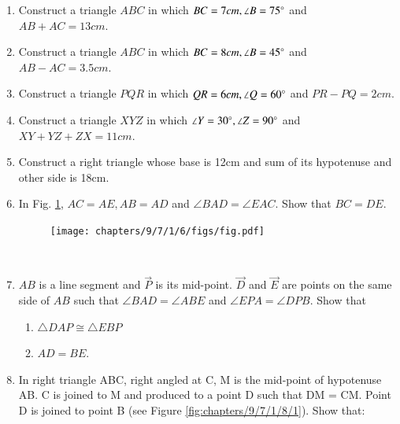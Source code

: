 \begin{enumerate}[label=\thesection.\arabic*,ref=\thesection.\theenumi]
\item Construct a triangle $ABC$ in which $BC=7cm, \angle{B}=75\degree$ and $AB + AC = 13 cm$.
\label{chapters/9/11/2/1}
%
%
\item Construct a triangle $ABC$ in which $BC=8cm, \angle{B}=45\degree$ and $AB - AC = 3.5 cm$.
\label{chapters/9/11/2/2}
\\
\solution

%
\item Construct a triangle $PQR$ in which $QR=6cm, \angle{Q}=60\degree$ and $PR - PQ = 2cm$.
\label{chapters/9/11/2/3}
%
%
\item Construct a triangle $XYZ$ in which $\angle{Y}=30\degree, \angle{Z}=90\degree$ and  $XY+YZ+ZX=11cm$.
\label{chapters/9/11/2/4}
%
%
\item Construct a right triangle whose base is 12cm and sum of its hypotenuse and other side is 18cm.
\label{chapters/9/11/2/5}
%
%
\item In Fig. \ref{fig:chapters/9/7/1/6/1}, $AC=AE,AB=AD$ and $\angle BAD=\angle EAC$. Show that $BC=DE$.
\label{chapters/9/7/1/6}
\begin{figure}[!h]
	\begin{center}
	\texttt{[image: chapters/9/7/1/6/figs/fig.pdf]}
	\end{center}
\caption{}
\label{fig:chapters/9/7/1/6/1}
\end{figure}
\\
\solution

\item 
	$AB$ is a line segment and $\vec{P}$ is its mid-point. $\vec{D}$ and $\vec{E}$ are points on the same side of
$AB$ such that $\angle BAD = \angle ABE$ and $\angle EPA = \angle DPB$. Show that
\label{chapters/9/7/1/7}
\begin{enumerate}
\item $\triangle DAP \cong \triangle EBP$
\item $AD = BE$.
\end{enumerate}
\solution

\item In right triangle ABC, right angled at C, M is the mid-point of hypotenuse AB. C is joined to M and produced to a point D such that DM = CM. Point D is joined to point B (see Figure \ref{fig:chapters/9/7/1/8/1}). Show that:

\end{enumerate}
